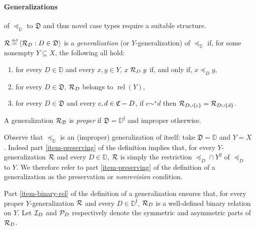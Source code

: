 \documentclass[12pt,a4paper,twoside]{article}
\newcommand{\relations}{\operatorname{rel}}
\newcommand{\novel}{\mathfrak f}
\newcommand{\precsimb}{\mathbin{\preceq}}
\newcommand{\preceqb}{\mathbin{\preceq}}
\newcommand{\ext}{\mathrel{\mc R}}
\newcommand{\sext}{\mathrel{\mc P}}
\newcommand{\next}{\mathrel{\mc I}}
\newcommand{\extb}{\mathbin{\mc R}}
\newcommand{\mbbd}{{\mathds D}}
\newcommand{\mbbdp}{{\mathds D^{\novel}}}
\newcommand{\dpp}{{\mathfrak D}}
\newcommand{\cpp}{{\mathfrak C}}
\begin{document}
\paragraph{Generalizations}\hskip-5pt of $\precsimb_{\mbbd}$ to $\dpp$ and thus
novel case types require a suitable structure.
\begin{definition}\label{def-{generalization}}
  $\extb \defeq \langle \extb_{D}: D\in \dpp \rangle$ is a
  \emph{{generalization}} (or $Y$-{generalization}) of
  $\preceq_{\mbbd}$ if, for some nonempty $Y \subseteq X$, the following all
  hold$:$

\begin{enumerate}%

\item \label{item-preserving} for every $D \in \mbbd$ and every $x,y\in Y$,
  $x \ext_{D} y$ if, and only if, $x \preceq_{D} y$,

\item\label{item-binary-rel} for every $D\in \dpp$, $\ext_{D}$ belongs
  to $\relations (Y)$,

\item \label{item-dimension} for every $D\in \dpp$ and %
every $c,d \in \cpp\bs D$,  if $c \sim ^ \star d$ then
  $\extb _ { D \cup \{c\} } = \extb _ { D \cup \{d\}}$.

\end{enumerate}
A {generalization} $\ext_{\dpp}$ is \emph{proper} if $\dpp = \mbbdp$ and improper
  otherwise.
\end{definition}
 Observe that $\preceq_\mbbd$ is an (improper)
{generalization} of itself: take $\dpp = \mbbd$ and $Y = X$.
Indeed part \ref{item-preserving} of the definition implies that, for every
$Y$-{generalization} $\ext$ and every $D\in \mbbd$, $\ext$ is simply the restriction
$\preceqb_{D}\cap Y^{2}$ of $\preceq_{D}$ to $Y$.  We therefore refer to part
\ref{item-preserving} of the definition of a {generalization} as the preservation or
\emph{nonrevision} condition.

Part \ref{item-binary-rel} of the definition of a {generalization} ensures that, for
every proper $Y$-{generalization} $\ext$ and every $D\in \mbbdp$, $\ext_{D}$ is a
well-defined binary relation on $Y$.  Let $\next_{D}$ and $\sext_{D}$
respectively denote the symmetric and asymmetric parts of $\ext_{D}$.
\end{document}
